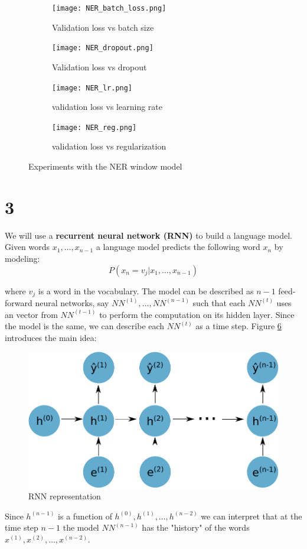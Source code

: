 \documentclass{article}
\begin{document}
\begin{figure}[H] 
  \begin{subfigure}[b]{0.5\linewidth}
    \centering
    \texttt{[image: NER\_batch\_loss.png]} 
    \caption{Validation loss vs batch size} 
    \label{ner_batch} 
    \vspace{4ex}
  \end{subfigure}%
  \begin{subfigure}[b]{0.5\linewidth}
    \centering
    \texttt{[image: NER\_dropout.png]} 
    \caption{Validation loss vs dropout} 
    \label{ner_dropout} 
    \vspace{4ex}
  \end{subfigure} 
  \begin{subfigure}[b]{0.5\linewidth}
    \centering
    \texttt{[image: NER\_lr.png]} 
    \caption{validation loss vs learning rate} 
    \label{ner_lr} 
  \end{subfigure}%
  \begin{subfigure}[b]{0.5\linewidth}
    \centering
    \texttt{[image: NER\_reg.png]} 
    \caption{validation loss vs regularization} 
    \label{ner_reg} 
  \end{subfigure} 
  \caption{Experiments with the NER window model}
  \label{NER_e} 
\end{figure}

\section{3} We will use a \textbf{recurrent neural network (RNN)} to build a language model. Given words $x_{1}, \dots ,x_{n-1}$ a language model predicts the following word $x_{n}$ by modeling:
\[
P(x_{n} = v_{j} | x_{1}, \dots ,x_{n-1})
\]

where $v_{j}$ is a word in the vocabulary. The model can be described as $n-1$ feed-forward neural networks, say $NN^{(1)}, \dots,NN^{(n-1)} $ such that each $NN^{(t)}$ uses an vector from $NN^{(t-1)}$ to perform the computation on its hidden layer. Since the model is the same, we can describe each $NN^{(t)}$ as a time step. Figure \ref{RNN_re} introduces the main idea:     

\begin{figure}[H] 
\begin{center}
\includegraphics[scale=0.85]{RNN_ball.pdf}
\end{center}
\caption{RNN representation}
\label{RNN_re}
\end{figure}

Since $h^{(n-1)}$ is a function of $h^{(0)},h^{(1)}, \dots, h^{(n-2)}$ we can interpret that at the time step $n-1$ the model $NN^{(n-1)}$ has the "history" of the words $x^{(1)}, x^{(2)}, \dots, x^{(n-2)}$.  
\end{document}
